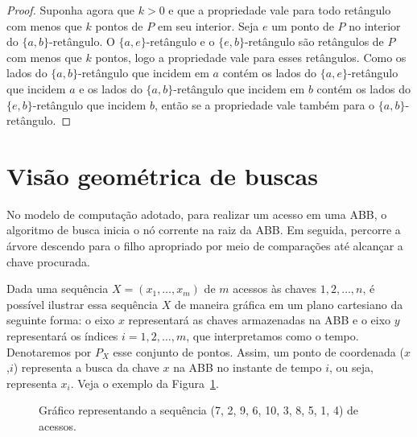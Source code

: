 \begin{proof}
    Suponha agora que $k > 0$ e que a propriedade vale para todo retângulo com menos que $k$ pontos de $P$ em seu interior. Seja $e$ um ponto de $P$ no interior do $\{a,b\}$-retângulo. O $\{a,e\}$-retângulo e o $\{e,b\}$-retângulo são retângulos de $P$ com menos que $k$ pontos, logo a propriedade vale para esses retângulos. Como os lados do $\{a,b\}$-retângulo que incidem em $a$ contém os lados do $\{a,e\}$-retângulo que incidem $a$ e os lados do $\{a,b\}$-retângulo que incidem em $b$ contém os lados do $\{e,b\}$-retângulo que incidem $b$, então se a propriedade vale também para o $\{a,b\}$-retângulo.    
\end{proof}

\section{Visão geométrica de buscas}

No modelo de computação adotado, para realizar um acesso em uma ABB, o algoritmo de busca inicia o nó corrente na raiz da ABB. Em seguida, percorre a árvore descendo para o filho apropriado por meio de comparações até alcançar a chave procurada.

Dada uma sequência $X = (x_{1},\ldots,x_{m})$ de $m$ acessos às chaves $1,2,\ldots,n$, é possível ilustrar essa sequência $X$ de maneira gráfica em um plano cartesiano da seguinte forma: o eixo $x$ representará as chaves armazenadas na ABB e o eixo $y$ representará os índices $i = 1,2,\ldots,m$, que interpretamos como o tempo. Denotaremos por $P_X$ esse conjunto de pontos. Assim, um ponto de coordenada ($x$,$i$) representa a busca da chave $x$ na ABB no instante de tempo $i$, ou seja, representa $x_i$. Veja o exemplo da Figura~\ref{fig:busca_padrao}.

\begin{figure}
    \caption{Gráfico representando a sequência (7, 2, 9, 6, 10, 3, 8, 5, 1, 4) de acessos.}
\label{fig:busca_padrao}
\end{figure}

